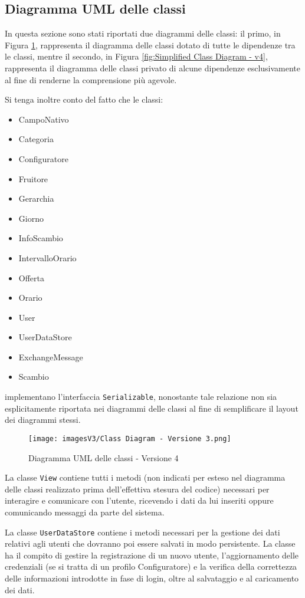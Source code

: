 \subsection{Diagramma UML delle classi}
In questa sezione sono stati riportati due diagrammi delle classi: il primo, in Figura \ref{fig:Class Diagram - v4}, rappresenta il diagramma delle classi dotato di tutte le dipendenze tra le classi, mentre il secondo, in Figura \ref{fig:Simplified Class Diagram - v4}, rappresenta il diagramma delle classi privato di alcune dipendenze esclusivamente al fine di renderne la comprensione più agevole.

Si tenga inoltre conto del fatto che le classi:
\begin{itemize}
    \item CampoNativo
    \item Categoria
    \item Configuratore
    \item Fruitore
    \item Gerarchia
    \item Giorno
    \item InfoScambio
    \item IntervalloOrario
    \item Offerta
    \item Orario
    \item User
    \item UserDataStore
    \item ExchangeMessage
    \item Scambio
\end{itemize}
implementano l'interfaccia \texttt{Serializable}, nonostante tale relazione non sia esplicitamente riportata nei diagrammi delle classi al fine di semplificare il layout dei diagrammi stessi.

\begin{figure}[h!]
    \centering
    \texttt{[image: imagesV3/Class Diagram - Versione 3.png]}
    \caption{\label{fig:Class Diagram - v4}Diagramma UML delle classi - Versione 4}
\end{figure} 

La classe \texttt{View} contiene tutti i metodi (non indicati per esteso nel diagramma delle classi realizzato prima dell'effettiva stesura del codice) necessari per interagire e comunicare con l'utente, ricevendo i dati da lui inseriti oppure comunicando messaggi da parte del sistema.

La classe \texttt{UserDataStore} contiene i metodi necessari per la gestione dei dati relativi agli utenti che dovranno poi essere salvati in modo persistente. La classe ha il compito di gestire la registrazione di un nuovo utente, l'aggiornamento delle credenziali (se si tratta di un profilo Configuratore) e la verifica della correttezza delle informazioni introdotte in fase di login, oltre al salvataggio e al caricamento dei dati. 

